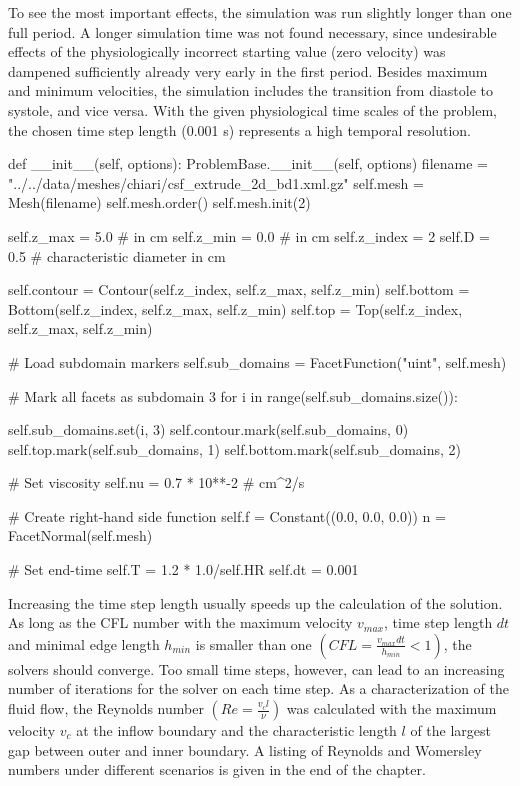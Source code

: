 To see the most important effects, the simulation was run slightly
longer than one full period. A longer simulation time was not found
necessary, since undesirable effects of the physiologically incorrect
starting value (zero velocity) was dampened sufficiently already very
early in the first period. Besides maximum and minimum velocities, the
simulation includes the transition from diastole to systole, and vice
versa.  With the given physiological time scales of the problem, the
chosen time step length (0.001 s) represents a high temporal
resolution.
\begin{python}
def __init__(self, options):
    ProblemBase.__init__(self, options)
    filename = "../../data/meshes/chiari/csf_extrude_2d_bd1.xml.gz"
    self.mesh = Mesh(filename)
    self.mesh.order()
    self.mesh.init(2)

    self.z_max = 5.0	# in cm
    self.z_min = 0.0	# in cm
    self.z_index = 2
    self.D = 0.5 		# characteristic diameter in cm

    self.contour = Contour(self.z_index, self.z_max, self.z_min)
    self.bottom = Bottom(self.z_index, self.z_max, self.z_min)
    self.top = Top(self.z_index, self.z_max, self.z_min)

    # Load subdomain markers
    self.sub_domains = FacetFunction("uint", self.mesh)

    # Mark all facets as subdomain 3
    for i in range(self.sub_domains.size()):

        self.sub_domains.set(i, 3)
        self.contour.mark(self.sub_domains, 0)
        self.top.mark(self.sub_domains, 1)
        self.bottom.mark(self.sub_domains, 2)

        # Set viscosity
        self.nu = 0.7 * 10**-2 # cm^2/s

        # Create right-hand side function
        self.f = Constant((0.0, 0.0, 0.0))
        n = FacetNormal(self.mesh)

        # Set end-time
        self.T = 1.2 * 1.0/self.HR
        self.dt = 0.001
\end{python}

Increasing the time step length usually speeds up the calculation of
the solution. As long as the CFL number with the maximum velocity
$v_{max}$, time step length $dt$ and minimal edge length $h_{min}$ is
smaller than one $(CFL = \frac{v_{max} dt}{h_{min}} < 1)$, the solvers
should converge. Too small time steps, however, can lead to an
increasing number of iterations for the solver on each time step.  As
a characterization of the fluid flow, the Reynolds number $(Re =
\frac{v_c l}{\nu})$ was calculated with the maximum velocity $v_c$ at
the inflow boundary and the characteristic length $l$ of the largest
gap between outer and inner boundary. A listing of Reynolds and Womersley numbers
under different scenarios is given in the end of the chapter.

